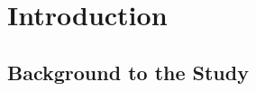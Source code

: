 \clearpage
{}
\setcounter{page}{1}

\label{ch:intro}
\chapter{Introduction}

\vspace{-1cm}
\setlength{\parindent}{0pt}
\vspace{0.3cm}

\section{Background to the Study}
\label{sec:background}


